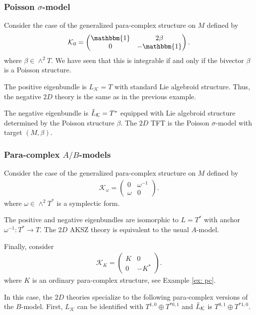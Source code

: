 \documentclass[letterpaper,12pt]{article}
\newcommand{\KK}{\mathcal{K}}
\newcommand{\id}{\mathbbm{1}}
\theoremstyle{definition}
\theoremstyle{remark}
\theoremstyle{examples}
\begin{document}
\subsubsection*{Poisson $\sigma$-model}
Consider the case of the generalized para-complex structure on $M$ defined by
\begin{align*}
\KK_0=
\begin{pmatrix}
\id & 2 \beta \\
0 & -\id
\end{pmatrix}.
\end{align*}
where $\beta \in \wedge^2 T$.
We have seen that this is integrable if and only if the bivector $\beta$ is a Poisson structure. 

The positive eigenbundle is $L_{\KK} = T$ with standard Lie algebroid structure. 
Thus, the negative $2D$ theory is the same as in the previous example.

The negative eigenbundle is $\Tilde{L}_\KK = T^*$ equipped with Lie algebroid structure determined by the Poisson structure $\beta$. 
The $2D$ TFT is the Poisson $\sigma$-model with target $(M, \beta)$. 

\subsubsection*{Para-complex $A/B$-models}
Consider the case of the generalized para-complex structure on $M$ defined by
\begin{align*}
\KK_\omega =
\begin{pmatrix}
0 & \omega^{-1} \\
\omega & 0
\end{pmatrix}.
\end{align*}
where $\omega \in \wedge^2 T^*$ is a symplectic form.

The positive and negative eigenbundles are isomorphic to $L = T^*$ with anchor $\omega^{-1} : T^* \to T$. 
The $2D$ AKSZ theory is equivalent to the usual $A$-model. 

Finally, consider 
\begin{align*}
\KK_K =
\begin{pmatrix}
K & 0 \\
0 & -K^*
\end{pmatrix}.
\end{align*}
where $K$ is an ordinary para-complex structure, see Example \ref{ex: pc}. 

In this case, the $2D$ theories specialize to the following para-complex versions of the $B$-model.
First, $L_{\KK}$ can be identified with $T^{1,0} \oplus T^{*0,1}$ and $\Tilde{L}_{\KK}$ is $T^{0,1} \oplus T^{*1,0}$. 
\end{document}
